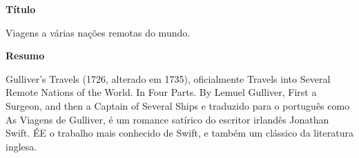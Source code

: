 \label{ch:abstractPT}


\begin{center}
\Large \textbf{T\'{i}tulo}
\end{center}

Viagens a v\'{a}rias na\c{c}\~{o}es remotas do mundo.

\begin{center}
\Large \textbf{Resumo}
\end{center}

Gulliver's Travels (1726, alterado em 1735), oficialmente Travels into Several Remote Nations of the World. In Four Parts. By Lemuel Gulliver, First a Surgeon, and then a Captain of Several Ships e traduzido para o português como As Viagens de Gulliver, \'{e} um romance sat\'{i}rico do escritor irland\^{e}s Jonathan Swift. \'{E}E o trabalho mais conhecido de Swift, e tamb\'{e}m um cl\'{a}ssico da literatura inglesa.

